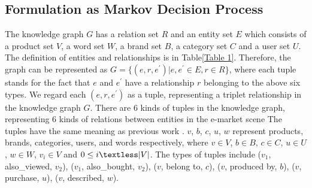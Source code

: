 \documentclass[review]{elsarticle}
\begin{document}
\begin{sloppypar}
\subsection{Formulation as Markov Decision Process}
\label{mdp}
The knowledge graph $G$ has a relation set $R$ and an entity set $E$ which consists of a product set $V$, a word set $W$, a brand set $B$, a category set $C$ and a user set $U$. The definition of entities and relationships is in Table\ref{Table 1}. 
Therefore, the graph can be represented as $G=\{(e,r,e^{'})|e,e^{'} \in E, r \in R\}$, where each tuple stands for the fact that $e$ and $e^{'}$ have a relationship $r$ belonging to the above six types. 
We regard each $(e,r,e^{'})$ as a tuple, representing a triplet relationship in the knowledge graph $G$.
There are 6 kinds of tuples in the knowledge graph, representing 6 kinds of relations between entities in the e-market scene
The tuples have the same meaning as previous work \cite{xian2019reinforcement}. 
$v$, $b$, $c$, $u$, $w$ represent products, brands, categories, users, and words respectively, where $v \in V$, $b \in B$, $c \in C$, $u \in U$, $w \in W$, $v_{i} \in V$ and $0 \leq i \textless |V|$.
The types of tuples include ($v_{1}$, also\_viewed, $v_{2}$), ($v_{1}$, also\_bought, $v_{2}$), ($v$, belong to, $c$), ($v$, produced by, $b$), ($v$, purchase, $u$), ($v$, described, $w$).


\end{sloppypar}
\end{document}
